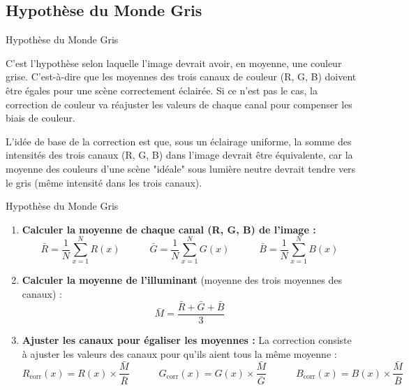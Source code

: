 \documentclass[8pt,a4paper]{beamer}
\numberwithin{figure}{section}
\begin{document}
\subsection{Hypothèse du Monde Gris}
\begin{frame}{Hypothèse du Monde Gris}
\par C'est l'hypothèse selon laquelle l'image devrait avoir, en moyenne, une couleur grise. C'est-à-dire que les moyennes des trois canaux de couleur (R, G, B) doivent être égales pour une scène correctement éclairée. Si ce n'est pas le cas, la correction de couleur va réajuster les valeurs de chaque canal pour compenser les biais de couleur.
\vspace{3mm}
\par L'idée de base de la correction est que, sous un éclairage uniforme, la somme des intensités des trois canaux (R, G, B) dans l'image devrait être équivalente, car la moyenne des couleurs d'une scène "idéale" sous lumière neutre devrait tendre vers le gris (même intensité dans les trois canaux).
\end{frame}

\begin{frame}{Hypothèse du Monde Gris}
\begin{enumerate}
    \item \textbf{Calculer la moyenne de chaque canal (R, G, B) de l'image :}
    $$
    \bar{R} = \frac{1}{N} \sum_{x=1}^{N} R(x) \quad\quad\quad \bar{G} = \frac{1}{N} \sum_{x=1}^{N} G(x) \quad\quad\quad \bar{B} = \frac{1}{N} \sum_{x=1}^{N} B(x)
    $$
    
    \item \textbf{Calculer la moyenne de l'illuminant} (moyenne des trois moyennes des canaux) :
    \[
    \bar{M} = \frac{\bar{R} + \bar{G} + \bar{B}}{3}
    \]

    \item \textbf{Ajuster les canaux pour égaliser les moyennes :} La correction consiste à ajuster les valeurs des canaux pour qu'ils aient tous la même moyenne :
    $$
    R_{\text{corr}}(x) = R(x) \times \frac{\bar{M}}{\bar{R}} \quad\quad\quad G_{\text{corr}}(x) = G(x) \times \frac{\bar{M}}{\bar{G}} \quad\quad\quad B_{\text{corr}}(x) = B(x) \times \frac{\bar{M}}{\bar{B}}
    $$
\end{enumerate}
\end{frame}
\end{document}
